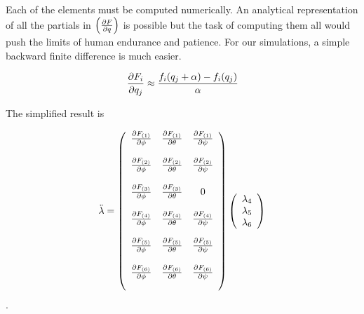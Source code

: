 Each of the elements must be computed numerically. An analytical representation of all the partials in $\left(\frac{\partial F}{\partial q}\right)$ is possible but the task of computing them all would push the limits of human endurance and patience. For our simulations, a simple backward finite difference is much easier.

\begin{equation}
    \frac{\partial F_i}{\partial q_j} \approx \frac{ f_i(q_j + \alpha) - f_i(q_j)  }{\alpha}
\end{equation}


The simplified result is

\begin{equation}
    \ddot \lambda = \left(
    \begin{array}{c c c c c c}
    \frac{\partial F_{(1)}}{\partial \phi} & \frac{\partial F_{(1)}}{\partial \theta} & \frac{\partial F_{(1)}}{\partial \psi}\\\\

    \frac{\partial F_{(2)}}{\partial \phi} & \frac{\partial F_{(2)}}{\partial \theta} & \frac{\partial F_{(2)}}{\partial \psi}\\\\

    \frac{\partial F_{(3)}}{\partial \phi} & \frac{\partial F_{(3)}}{\partial \theta} & 0\\\\

    \frac{\partial F_{(4)}}{\partial \phi} & \frac{\partial F_{(4)}}{\partial \theta} & \frac{\partial F_{(4)}}{\partial \psi}\\\\

    \frac{\partial F_{(5)}}{\partial \phi} & \frac{\partial F_{(5)}}{\partial \theta} & \frac{\partial F_{(5)}}{\partial \psi}\\\\

    \frac{\partial F_{(6)}}{\partial \phi} & \frac{\partial F_{(6)}}{\partial \theta} & \frac{\partial F_{(6)}}{\partial \psi}\\\\

    \end{array}\right)\left(\begin{array}{c} \lambda_4\\  \lambda_5\\ \lambda_6\\ \end{array}\right)
\end{equation}.




